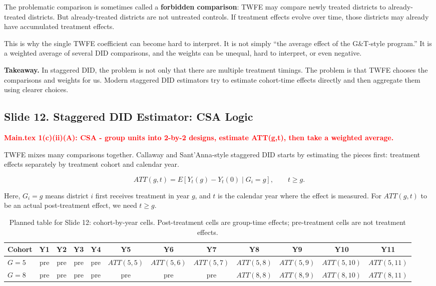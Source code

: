 \documentclass[11pt]{article}
\newcommand{\slideheading}[2]{%
  \subsection*{Slide #1. #2}
}
\newcommand{\slidecontent}[1]{#1}
\newcommand{\mainpoint}[1]{%
  \slidecontent{\textcolor{red}{\textbf{Main.tex #1}}}
}
\begin{document}
\slidecontent{The problematic comparison is sometimes called a
\textbf{forbidden comparison}: TWFE may compare newly treated districts to
already-treated districts. But already-treated districts are not untreated
controls. If treatment effects evolve over time, those districts may already
have accumulated treatment effects.}

\slidecontent{This is why the single TWFE coefficient can become hard to
interpret. It is not simply ``the average effect of the G\&T-style program.''
It is a weighted average of several DID comparisons, and the weights can be
unequal, hard to interpret, or even negative.}

\slidecontent{\textbf{Takeaway.} In staggered DID, the problem is not only that
there are multiple treatment timings. The problem is that TWFE chooses the
comparisons and weights for us. Modern staggered DID estimators try to estimate
cohort-time effects directly and then aggregate them using clearer choices.}

\clearpage

\slideheading{12}{Staggered DID Estimator: CSA Logic}
\mainpoint{1(c)(ii)(A): CSA - group units into 2-by-2 designs, estimate ATT(g,t), then take a weighted average.}

\slidecontent{TWFE mixes many comparisons together. Callaway and
Sant'Anna-style staggered DID starts by estimating the pieces first: treatment
effects separately by treatment cohort and calendar year.}

\[
ATT(g,t)
=
E[Y_t(g) - Y_t(0) \mid G_i = g],
\qquad t \geq g.
\]

\slidecontent{Here, $G_i=g$ means district $i$ first receives treatment in year
$g$, and $t$ is the calendar year where the effect is measured. For
$ATT(g,t)$ to be an actual post-treatment effect, we need $t \geq g$.}

\begin{table}[H]
\centering
\tiny
\begin{tabular}{lccccccccccc}
\toprule
\textbf{Cohort} & \textbf{Y1} & \textbf{Y2} & \textbf{Y3} & \textbf{Y4} & \textbf{Y5} & \textbf{Y6} & \textbf{Y7} & \textbf{Y8} & \textbf{Y9} & \textbf{Y10} & \textbf{Y11} \\
\midrule
$G=5$ & pre & pre & pre & pre & $ATT(5,5)$ & $ATT(5,6)$ & $ATT(5,7)$ & $ATT(5,8)$ & $ATT(5,9)$ & $ATT(5,10)$ & $ATT(5,11)$ \\
$G=8$ & pre & pre & pre & pre & pre & pre & pre & $ATT(8,8)$ & $ATT(8,9)$ & $ATT(8,10)$ & $ATT(8,11)$ \\
\bottomrule
\end{tabular}
\caption*{\footnotesize Planned table for Slide 12: cohort-by-year cells. Post-treatment cells are group-time effects; pre-treatment cells are not treatment effects.}
\end{table}
\end{document}
